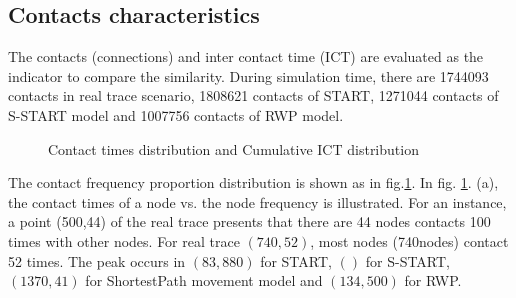 \subsection{Contacts characteristics}

The contacts (connections) and inter contact time (ICT) \cite{vHuWang-23} are evaluated as the indicator to compare the similarity.
During simulation time, there are 1744093 contacts in real trace scenario, 1808621 contacts of START, 1271044 contacts of S-START model and 1007756 contacts of RWP model. 

\begin{figure}[htbp]
\centering
{}

\caption{Contact times distribution and Cumulative ICT distribution}\label{figure_contacts}
\end{figure}

The contact frequency proportion distribution is shown as in fig.\ref{figure_contacts}. In fig. \ref{figure_contacts}. (a), the contact times of a node vs. the node frequency is illustrated. For an instance, a point (500,44) of the real trace presents that there are 44 nodes contacts 100 times with other nodes. For real trace $(740,52)$, most nodes (740nodes) contact 52 times.  The peak occurs in $(83, 880)$ for START, $()$ for S-START, $(1370,41)$ for ShortestPath movement model and $(134, 500)$ for RWP.

